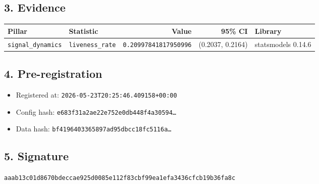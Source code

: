\documentclass{article}
\begin{document}
\subsection*{3. Evidence}
\begin{tabular}{llrrl}\toprule
\textbf{Pillar} & \textbf{Statistic} & \textbf{Value} & \textbf{95\% CI} & \textbf{Library} \\\midrule
\texttt{signal\_dynamics} & \texttt{liveness\_rate} & \texttt{0.20997841817950996} & (0.2037, 0.2164) & statsmodels 0.14.6 \\
\bottomrule\end{tabular}
\subsection*{4. Pre-registration}
\begin{itemize}
\item Registered at: \texttt{2026-05-23T20:25:46.409158+00:00}
\item Config hash: \texttt{e683f31a2ae22e752e0db448f4a30594\dots}
\item Data hash: \texttt{bf4196403365897ad95dbcc18fc5116a\dots}
\end{itemize}
\subsection*{5. Signature}
\texttt{aaab13c01d8670bdeccae925d0085e112f83cbf99ea1efa3436cfcb19b36fa8c}\\
\end{document}
